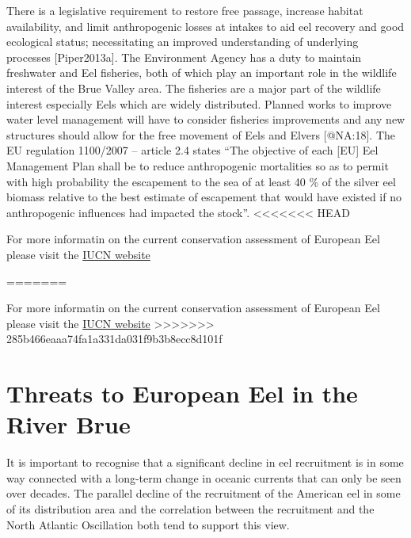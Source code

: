\documentclass[]{article}
\begin{document}
There is a legislative requirement to restore free passage, increase
habitat availability, and limit anthropogenic losses at intakes to aid
eel recovery and good ecological status; necessitating an improved
understanding of underlying processes {[}Piper2013a{]}. The Environment
Agency has a duty to maintain freshwater and Eel fisheries, both of
which play an important role in the wildlife interest of the Brue Valley
area. The fisheries are a major part of the wildlife interest especially
Eels which are widely distributed. Planned works to improve water level
management will have to consider fisheries improvements and any new
structures should allow for the free movement of Eels and Elvers
{[}@NA:18{]}. The EU regulation 1100/2007 -- article 2.4 states ``The
objective of each {[}EU{]} Eel Management Plan shall be to reduce
anthropogenic mortalities so as to permit with high probability the
escapement to the sea of at least 40 \% of the silver eel biomass
relative to the best estimate of escapement that would have existed if
no anthropogenic influences had impacted the stock''.
\textless{}\textless{}\textless{}\textless{}\textless{}\textless{}\textless{}
HEAD

For more informatin on the current conservation assessment of European
Eel please visit the
\href{https://www.iucnredlist.org/species/60344/45833138}{IUCN website}

=======

For more informatin on the current conservation assessment of European
Eel please visit the
\href{https://www.iucnredlist.org/species/60344/45833138}{IUCN website}
\textgreater{}\textgreater{}\textgreater{}\textgreater{}\textgreater{}\textgreater{}\textgreater{}
285b466eaaa74fa1a331da031f9b3b8ecc8d101f

\hypertarget{threats-to-european-eel-in-the-river-brue}{%
\section{Threats to European Eel in the River
Brue}\label{threats-to-european-eel-in-the-river-brue}}

It is important to recognise that a significant decline in eel
recruitment is in some way connected with a long-term change in oceanic
currents that can only be seen over decades. The parallel decline of the
recruitment of the American eel in some of its distribution area and the
correlation between the recruitment and the North Atlantic Oscillation
both tend to support this view.
\end{document}

